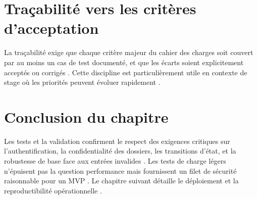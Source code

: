 \section{Traçabilité vers les critères d'acceptation}

La traçabilité exige que chaque critère majeur du cahier des charges soit couvert par au moins un cas de test documenté, et que les écarts soient explicitement acceptés ou corrigés \cite{ieee1012,pressman2014}. Cette discipline est particulièrement utile en contexte de stage où les priorités peuvent évoluer rapidement \cite{sommerville2016}.

\section{Conclusion du chapitre}

Les tests et la validation confirment le respect des exigences critiques sur l'authentification, la confidentialité des dossiers, les transitions d'état, et la robustesse de base face aux entrées invalides \cite{owasp2021,iso25010}. Les tests de charge légers n'épuisent pas la question performance mais fournissent un filet de sécurité raisonnable pour un MVP \cite{kleppmann2017}. Le chapitre suivant détaille le déploiement et la reproductibilité opérationnelle \cite{dockerdoc,twelvefactor}.
